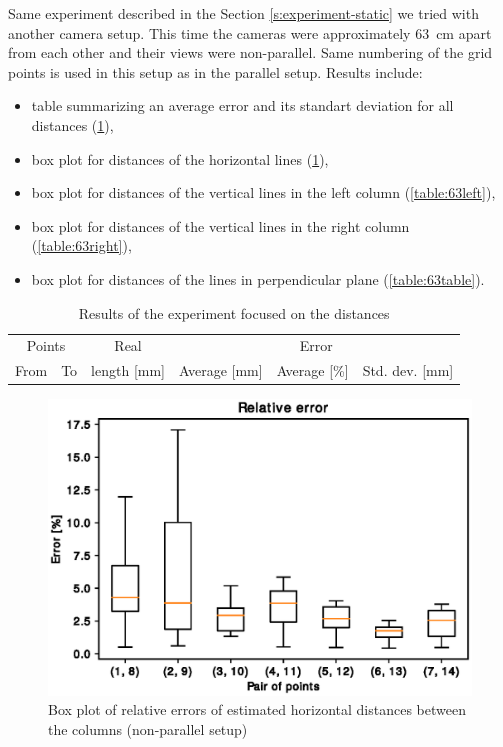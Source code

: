 Same experiment described in the Section \ref{s:experiment-static} we tried
with another camera setup. This time the cameras were approximately 63~cm apart
from each other and their views were non-parallel. Same numbering of the grid
points is used in this setup as in the parallel setup.
\newline
Results include:
\begin{itemize}
\item table summarizing an average error and its standart deviation for all distances (\ref{table:63}),
\item box plot for distances of the horizontal lines (\ref{table:63horizontal}),
\item box plot for distances of the vertical lines in the left column (\ref{table:63left}),
\item box plot for distances of the vertical lines in the right column (\ref{table:63right}),
\item box plot for distances of the lines in perpendicular plane (\ref{table:63table}).
\end{itemize}

\begin{table}
\centering
\begin{tabular}{|r|r|r|r|r|r|}
\hline
\multicolumn{2}{|c|}{Points} & \multicolumn{1}{c|}{Real} & \multicolumn{3}{c|}{Error} \\
\cline{1-2} \cline{4-6}
From & To & length [mm] & Average [mm] & Average [\%] & Std. dev. [mm]\\
\hline
\hline

\hline
\end{tabular}
\caption{Results of the experiment focused on the distances}
\label{table:63}
\end{table}

\begin{figure}
\includegraphics[width=\linewidth]{experiments/63/horizontal1.eps}
\caption{Box plot of relative errors of estimated horizontal distances between the columns (non-parallel setup)}
\label{table:63horizontal}
\end{figure}

